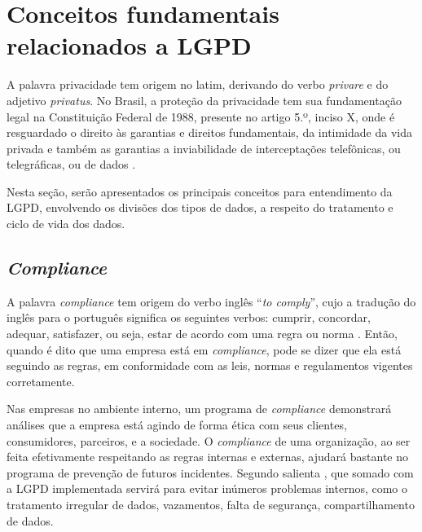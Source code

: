 \documentclass[
	12pt,				%
	openright,			%
	oneside,			%
	a4paper,			%
	english,			%
	french,				%
	spanish,			%
	brazil,				%
	]{abntex2}
\begin{document}
\section{Conceitos fundamentais relacionados a LGPD }
A palavra privacidade tem origem no latim, derivando do verbo \textit{privare} e do adjetivo \textit{privatus}.  No Brasil, a proteção da privacidade tem sua fundamentação legal na Constituição Federal de 1988, presente no artigo 5.º, inciso X, onde é resguardado o direito às garantias e direitos fundamentais, da intimidade da vida privada e também as garantias a inviabilidade de interceptações telefônicas, ou telegráficas, ou de dados \cite{Doneda2020}.

Nesta seção, serão apresentados os principais conceitos para entendimento da LGPD, envolvendo os divisões dos tipos de dados, a respeito do tratamento e ciclo de vida dos dados.


\subsection{\textit{Compliance}}

A palavra \textit{compliance} tem origem do verbo inglês “\textit{to comply}”, cujo a tradução do inglês para o português significa os seguintes verbos: cumprir, concordar, adequar, satisfazer, ou seja, estar de acordo com uma regra ou norma \cite{Lamboy2018}. Então, quando é dito que uma empresa está em \textit{compliance}, pode se dizer que ela está seguindo as regras, em conformidade com as leis, normas e regulamentos vigentes corretamente.

Nas empresas no ambiente interno, um programa de \textit{compliance} demonstrará análises que a empresa está agindo de forma ética com seus clientes, consumidores, parceiros, e a sociedade. O \textit{compliance} de uma organização, ao ser feita efetivamente respeitando as regras internas e externas, ajudará bastante no programa de prevenção de futuros incidentes. Segundo salienta , que somado com a LGPD implementada servirá para evitar inúmeros problemas internos, como o tratamento irregular de dados, vazamentos, falta de segurança, compartilhamento de dados.
\end{document}
